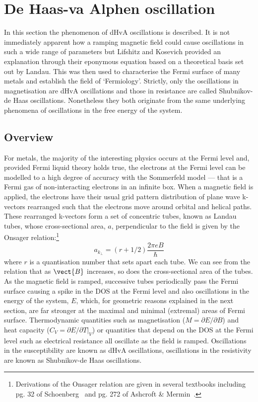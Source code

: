 
\section{De Haas-va Alphen oscillation}

In this section the phenomenon of \ac{dHvA} oscillations is described. It is not immediately apparent how a ramping magnetic field could cause oscillations in such a wide range of parameters but Lifshitz and Kosevich provided an explanation through their eponymous equation based on a theoretical basis set out by Landau. This was then used to characterise the Fermi surface of many metals and establish the field of `Fermiology'. Strictly, only the oscillations in magnetisation are \ac{dHvA} oscillations and those in resistance are called Shubnikov-de Haas oscillations. Nonetheless they both originate from the same underlying phenomena of oscillations in the free energy of the system.

\subsection{Overview}
    \label{Sec:Theo:dHvAOverview}

For metals, the majority of the interesting physics occurs at the Fermi level and, provided Fermi liquid theory holds true, the electrons at the Fermi level can be modelled to a high degree of accuracy with the Sommerfeld model --- that is a Fermi gas of non-interacting electrons in an infinite box. When a magnetic field is applied, the electrons have their usual grid pattern distribution of plane wave k-vectors rearranged such that the electrons move around orbital and helical paths. These rearranged k-vectors form a set of concentric tubes, known as Landau tubes, whose cross-sectional area, $a$, perpendicular to the field is given by the Onsager relation:\footnote{Derivations of the Onsager relation are given in several textbooks including pg. 32 of Schoenberg~\cite{Schoenberg1984} and pg. 272 of Ashcroft \& Mermin~\cite{Ashcroft1976}.} 
\begin{equation}
\label{Eqn:Theo:Onsager}
\textit{a}_{k_{\perp}} = (r + 1/2)\frac{2\pi e B}{\hbar}
\end{equation}
where $r$ is a quantisation number that sets apart each tube. We can see from the relation that as $\vect{B}$ increases, so does the cross-sectional area of the tubes. As the magnetic field is ramped, successive tubes periodically pass the Fermi surface causing a spike in the \ac{DOS} at the Fermi level and also oscillations in the energy of the system, $E$, which, for geometric reasons explained in the next section, are far stronger at the maximal and minimal (extremal) areas of Fermi surface. Thermodynamic quantities such as magnetisation ($M = \partial E/\partial B$) and heat capacity ($C_{V} = \partial E/\partial T|_{V}$) or quantities that depend on the \ac{DOS} at the Fermi level such as electrical resistance all oscillate as the field is ramped. Oscillations in the susceptibility are known as \ac{dHvA} oscillations, oscillations in the resistivity are known as Shubnikov-de Haas oscillations.

